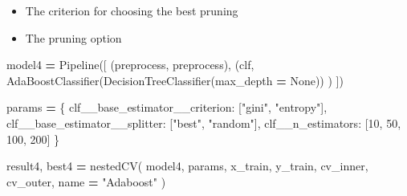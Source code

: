 \documentclass[
]{article}
\newenvironment{Shaded}{\begin{snugshade}}{\end{snugshade}}
\newcommand{\DecValTok}[1]{\textcolor[rgb]{0.00,0.00,0.81}{#1}}
\newcommand{\NormalTok}[1]{#1}
\newcommand{\OperatorTok}[1]{\textcolor[rgb]{0.81,0.36,0.00}{\textbf{#1}}}
\newcommand{\StringTok}[1]{\textcolor[rgb]{0.31,0.60,0.02}{#1}}
\newcommand{\VariableTok}[1]{\textcolor[rgb]{0.00,0.00,0.00}{#1}}
\providecommand{\tightlist}{%
  \setlength{\itemsep}{0pt}\setlength{\parskip}{0pt}}
\begin{document}
\begin{itemize}
\tightlist
\item
  The criterion for choosing the best pruning
\item
  The pruning option
\end{itemize}

\begin{Shaded}
\begin{Highlighting}[]
\NormalTok{model4 }\OperatorTok{=}\NormalTok{ Pipeline([}
\NormalTok{    (}\StringTok{\textquotesingle{}preprocess\textquotesingle{}}\NormalTok{, preprocess),}
\NormalTok{    (}\StringTok{\textquotesingle{}clf\textquotesingle{}}\NormalTok{,}
\NormalTok{     AdaBoostClassifier(DecisionTreeClassifier(max\_depth }\OperatorTok{=} \VariableTok{None}\NormalTok{))}
\NormalTok{    )}
\NormalTok{])}

\NormalTok{params }\OperatorTok{=}\NormalTok{ \{}
    \StringTok{\textquotesingle{}clf\_\_base\_estimator\_\_criterion\textquotesingle{}}\NormalTok{: [}\StringTok{"gini"}\NormalTok{, }\StringTok{"entropy"}\NormalTok{],}
    \StringTok{\textquotesingle{}clf\_\_base\_estimator\_\_splitter\textquotesingle{}}\NormalTok{: [}\StringTok{"best"}\NormalTok{, }\StringTok{"random"}\NormalTok{],}
    \StringTok{\textquotesingle{}clf\_\_n\_estimators\textquotesingle{}}\NormalTok{: [}\DecValTok{10}\NormalTok{, }\DecValTok{50}\NormalTok{, }\DecValTok{100}\NormalTok{, }\DecValTok{200}\NormalTok{]}
\NormalTok{\}}

\NormalTok{result4, best4 }\OperatorTok{=}\NormalTok{ nestedCV(}
\NormalTok{    model4, params, x\_train, y\_train,}
\NormalTok{    cv\_inner, cv\_outer, name }\OperatorTok{=} \StringTok{"Adaboost"}
\NormalTok{)}
\end{Highlighting}
\end{Shaded}
\end{document}
